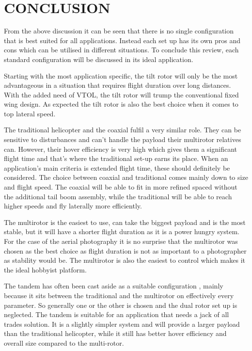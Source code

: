\documentclass[a4paper, 10pt, conference]{ieeeconf}
\begin{document}

   
\section{CONCLUSION}
From the above discussion it can be seen that there is no single configuration that is best suited for all applications. Instead each set up has its own pros and cons which can be utilised in different situations. To conclude this review, each standard configuration will be discussed in its ideal application.

Starting with the most application specific, the tilt rotor will only be the most advantageous in a situation that requires flight duration over long distances. With the added need of VTOL, the tilt rotor will trump the conventional fixed wing design. As expected the tilt rotor is also the best choice when it comes to top lateral speed.

The traditional helicopter and the coaxial fulfil a very similar role. They can be sensitive to disturbances and can't handle the payload their multirotor relatives can. However, their hover efficiency is very high which gives them a significant flight time and that's where the traditional set-up earns its place. When an application's main criteria is extended flight time, these should definitely be considered. The choice between coaxial and traditional comes mainly down to size and flight speed. The coaxial will be able to fit in more refined spaced without the additional tail boom assembly, while the traditional will be able to reach higher speeds and fly laterally more efficiently.

The multirotor is the easiest to use, can take the biggest payload and is the most stable, but it will have a shorter flight duration as it is a power hungry system. For the case of the aerial photography it is no surprise that the multirotor was chosen as the best choice as flight duration is not as important to a photographer as stability would be. The multirotor is also the easiest to control which makes it the ideal hobbyist platform.

The tandem has often been cast aside as a suitable configuration \cite{MiniFlying}, mainly because it sits between the traditional and the multirotor on effectively every parameter. So generally one or the other is chosen and the dual rotor set up is neglected. The tandem is suitable for an application that needs a jack of all trades solution. It is a slightly simpler system and will provide a larger payload than the traditional helicopter, while it still has better hover efficiency and overall size compared to the multi-rotor.
\end{document}
